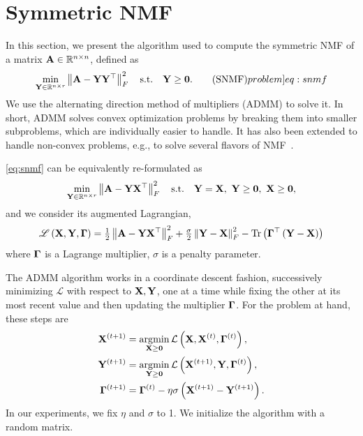 \documentclass[twoside,11pt]{article}
\begin{document}
\section{Symmetric NMF}
\label{sec:snmf}

In this section, we present the algorithm used to compute the symmetric NMF  of a matrix ${\mathbf{A}} \in {\mathbb R}^{n \times n}$, defined as
\begin{equation}
\min_{\mat{Y} \in \Real^{n \times r}}
\norm{\mat{A} - \mat{Y} \transpose{\mat{Y}}}{F}^2
\quad\text{s.t.}\quad
\mat{Y} \geq \mat{0}.
%
\tag{SNMF}
\label[problem]{eq:snmf}
\end{equation}
We use the alternating direction method of multipliers (ADMM) to solve it.
In short, ADMM solves convex optimization problems by breaking them into smaller subproblems, which are individually easier to handle. It has also been extended to handle non-convex problems, e.g., to solve several flavors of NMF~\citep{Fevotte2011,xu2012nmf,Tepper2014consensus,tepper2016compressed}.

\cref{eq:snmf} can be equivalently re-formulated as
\begin{equation}
\min_{\mat{Y} \in \Real^{n \times r}}
\norm{\mat{A} - \mat{Y} \transpose{\mat{X}}}{F}^2
%
\quad\text{s.t.}\quad
%
\mat{Y} = \mat{X},\
\mat{Y} \geq \mat{0},\ \mat{X} \geq \mat{0} ,
\end{equation}
and we consider its augmented Lagrangian,
\begin{equation}
\mathscr{L} \left( {\mathbf{X}}, {\mathbf{Y}}, {\mathbf{\Gamma}} \right) =
\tfrac{1}{2} \left\| {\mathbf{A}} - {\mathbf{Y}} {{\mathbf{X}}}^\top \right\|_{F}^2
+ \tfrac{\sigma}{2} \left\| {\mathbf{Y}} - {\mathbf{X}} \right\|_{F}^2
- \operatorname{Tr}\left( {{\mathbf{\Gamma}}}^\top \left( {\mathbf{Y}} - {\mathbf{X}} \right)\right)
\end{equation}
where ${\mathbf{\Gamma}}$ is a Lagrange multiplier, $\sigma$ is a penalty parameter.

The ADMM algorithm works in a coordinate descent fashion, successively minimizing $\mathscr{L}$ with respect to ${\mathbf{X}}, {\mathbf{Y}}$, one at a time while fixing the other at its most recent value and then updating the multiplier ${\mathbf{\Gamma}}$.
For the problem at hand, these steps are
\begin{subequations}
	\begin{align}
		{\mathbf{X}}^{(t+1)} &= \operatorname*{\arg\!\min}_{{\mathbf{X}} \geq {\mathbf{0}}} \mathcal{L} \left( {\mathbf{X}}, {\mathbf{X}}^{(t)}, {\mathbf{\Gamma}}^{(t)} \right) ,\\
		{\mathbf{Y}}^{(t+1)} &= \operatorname*{\arg\!\min}_{{\mathbf{Y}} \geq {\mathbf{0}}} \mathcal{L} \left( {\mathbf{X}}^{(t+1)}, {\mathbf{Y}}, {\mathbf{\Gamma}}^{(t)} \right) ,\\
		{\mathbf{\Gamma}}^{(t+1)} &= {\mathbf{\Gamma}}^{(t)} - \eta \sigma \left( {\mathbf{X}}^{(t+1)} - {\mathbf{Y}}^{(t+1)} \right) .
	\end{align}
\end{subequations}
In our experiments, we fix $\eta$ and $\sigma$ to 1. We initialize the algorithm with a random matrix.
\end{document}
